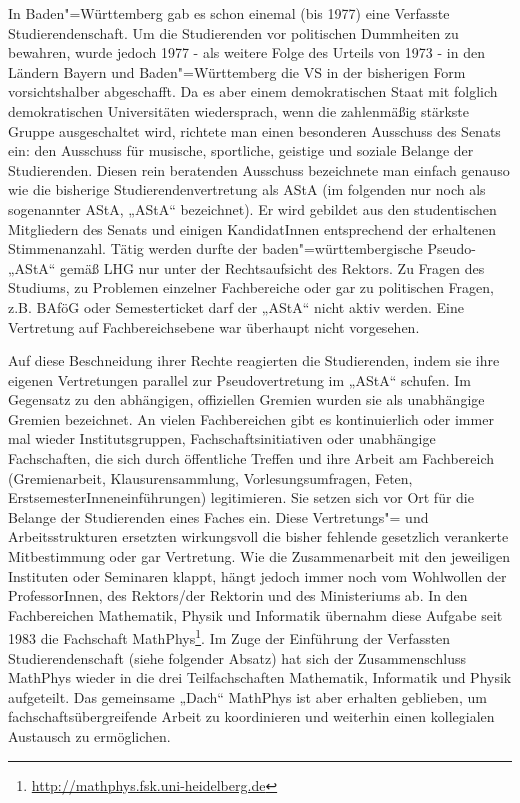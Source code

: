 In Baden"=Württemberg gab es schon einemal (bis 1977) eine Verfasste
Studierendenschaft. Um die Studierenden vor politischen Dummheiten zu bewahren,
wurde jedoch 1977 - als weitere Folge des Urteils von 1973 - in den Ländern
Bayern und Baden"=Württemberg die VS in der bisherigen Form vorsichtshalber
abgeschafft. Da es aber einem demokratischen Staat mit folglich demokratischen
Universitäten wiedersprach, wenn die zahlenmäßig stärkste Gruppe ausgeschaltet
wird, richtete man einen besonderen Ausschuss des Senats ein: den Ausschuss für
musische, sportliche, geistige und soziale Belange der Studierenden. Diesen
rein beratenden Ausschuss bezeichnete man einfach genauso wie die bisherige
Studierendenvertretung als AStA (im folgenden nur noch als sogenannter AStA,
„AStA“ bezeichnet). Er wird gebildet aus den studentischen Mitgliedern des
Senats und einigen KandidatInnen entsprechend der erhaltenen Stimmenanzahl.
Tätig werden durfte der baden"=württembergische Pseudo-„AStA“ gemäß LHG nur
unter der Rechtsaufsicht des Rektors. Zu Fragen des Studiums, zu Problemen
einzelner Fachbereiche oder gar zu politischen Fragen, z.B. BAföG oder
Semesterticket darf der „AStA“ nicht aktiv werden. Eine Vertretung auf
Fachbereichsebene war überhaupt nicht vorgesehen.

Auf diese Beschneidung ihrer Rechte reagierten die Studierenden, indem sie ihre
eigenen Vertretungen parallel zur Pseudovertretung im „AStA“ schufen. Im
Gegensatz zu den abhängigen, offiziellen Gremien wurden sie als unabhängige
Gremien bezeichnet.  An vielen Fachbereichen gibt es kontinuierlich oder immer
mal wieder Institutsgruppen, Fachschaftsinitiativen oder unabhängige
Fachschaften, die sich durch öffentliche Treffen und ihre Arbeit am Fachbereich
(Gremienarbeit, Klausurensammlung, Vorlesungsumfragen, Feten,
ErstsemesterInneneinführungen) legitimieren. Sie setzen sich vor Ort für die
Belange der Studierenden eines Faches ein. Diese Vertretungs"= und
Arbeitsstrukturen ersetzten wirkungsvoll die bisher fehlende gesetzlich
verankerte Mitbestimmung oder gar Vertretung. Wie die Zusammenarbeit mit den
jeweiligen Instituten oder Seminaren klappt, hängt jedoch immer noch vom
Wohlwollen der ProfessorInnen, des Rektors/der Rektorin und des Ministeriums
ab. In den Fachbereichen Mathematik, Physik und Informatik übernahm diese
Aufgabe seit 1983 die Fachschaft
MathPhys\footnote{\url{http://mathphys.fsk.uni-heidelberg.de}}.  Im Zuge der
Einführung der Verfassten Studierendenschaft (siehe folgender Absatz) hat sich
der Zusammenschluss MathPhys wieder in die drei Teilfachschaften Mathematik,
Informatik und Physik aufgeteilt.  Das gemeinsame „Dach“ MathPhys ist aber
erhalten geblieben, um fachschaftsübergreifende Arbeit zu koordinieren und
weiterhin einen kollegialen Austausch zu ermöglichen.

